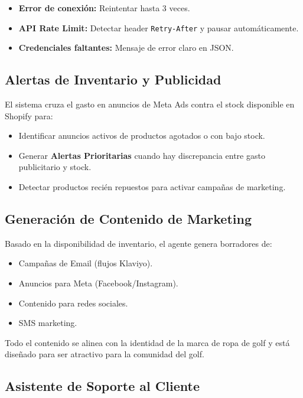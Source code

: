 \documentclass[a4paper,12pt]{article}
\begin{document}
\begin{itemize}
    \item \textbf{Error de conexión:} Reintentar hasta 3 veces.
    \item \textbf{API Rate Limit:} Detectar header \texttt{Retry-After} y pausar automáticamente.
    \item \textbf{Credenciales faltantes:} Mensaje de error claro en JSON.
\end{itemize}

\subsection{Alertas de Inventario y Publicidad}

El sistema cruza el gasto en anuncios de Meta Ads contra el stock disponible en Shopify para:

\begin{itemize}
    \item Identificar anuncios activos de productos agotados o con bajo stock.
    \item Generar \textbf{Alertas Prioritarias} cuando hay discrepancia entre gasto publicitario y stock.
    \item Detectar productos recién repuestos para activar campañas de marketing.
\end{itemize}

\subsection{Generación de Contenido de Marketing}

Basado en la disponibilidad de inventario, el agente genera borradores de:

\begin{itemize}
    \item Campañas de Email (flujos Klaviyo).
    \item Anuncios para Meta (Facebook/Instagram).
    \item Contenido para redes sociales.
    \item SMS marketing.
\end{itemize}

Todo el contenido se alinea con la identidad de la marca de ropa de golf y está diseñado para ser atractivo para la comunidad del golf.

\subsection{Asistente de Soporte al Cliente}
\end{document}

